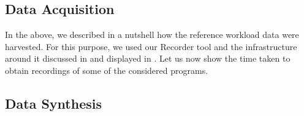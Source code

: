 

\subsection{Data Acquisition}
In the above, we described in a nutshell how the reference workload data were
harvested. For this purpose, we used our Recorder tool and the infrastructure
around it discussed in  and displayed in . Let us
now show the time taken to obtain recordings of some of the considered programs.

\subsection{Data Synthesis}
